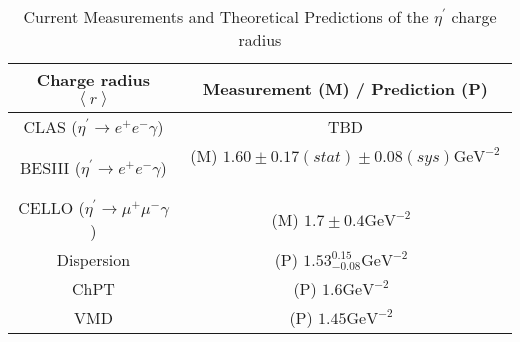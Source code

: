 \begin{table}[h!]
\begin{minipage}{\textwidth}
\begin{center}


\caption{\label{tab:etaP.models}Current Measurements and Theoretical Predictions of the $\eta^{\prime}$ charge radius \vspace{0.75mm}}
\begin{tabular}{cc}
\hline
Charge radius $\left< r\right>$ & Measurement (M) / Prediction (P) \\
\hline
CLAS ($\eta^{\prime}\to e^+e^-\gamma$)   & TBD \\
BESIII ($\eta^{\prime}\to e^+e^-\gamma$)   & (M) $1.60\pm0.17(stat)\pm0.08(sys) \mathrm{GeV}^{-2}$~\cite{bib7} \\
CELLO ($\eta^{\prime}\to \mu^+\mu^-\gamma$)   & (M)  $1.7\pm0.4 \mathrm{GeV}^{-2}$~\cite{bib9}  \\
\hline
Dispersion    & (P)  $1.53^{0.15}_{-0.08} \mathrm{GeV}^{-2}$~\cite{bib12}  \\
ChPT    & (P) $1.6 \mathrm{GeV}^{-2}$~\cite{bib11}  \\
VMD    & (P) $1.45  \mathrm{GeV}^{-2}$~\cite{bib10}  \\
\hline 
\end{tabular}


\end{center}
\end{minipage}
\end{table}
\vspace{20pt}